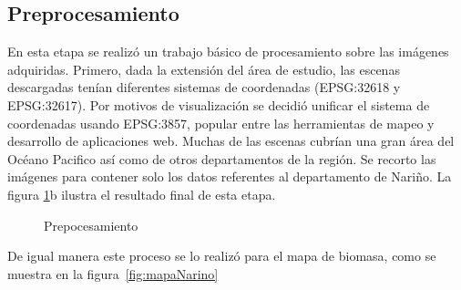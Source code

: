 \subsection{Preprocesamiento}

En esta etapa se realizó un trabajo básico de procesamiento sobre las imágenes adquiridas.  Primero, dada la extensión del área de estudio, las escenas descargadas tenían diferentes sistemas de coordenadas (EPSG:32618 y EPSG:32617).  Por motivos de visualización se decidió unificar el sistema de coordenadas usando EPSG:3857, popular entre las herramientas de mapeo y desarrollo de aplicaciones web.  Muchas de las escenas cubrían una gran área del Océano Pacifico así como de otros departamentos de la región.  Se recorto las imágenes para contener solo los datos referentes al departamento de Nariño.  La figura \ref{fig:cuts}b ilustra el resultado final de esta etapa.

\begin{figure}
  \centering
  \vfill
  \caption{Prepocesamiento}
  \label{fig:cuts}
\end{figure}

De igual manera este proceso se lo realizó para el mapa de biomasa, como se muestra en la figura~\ref{fig:mapaNarino}


